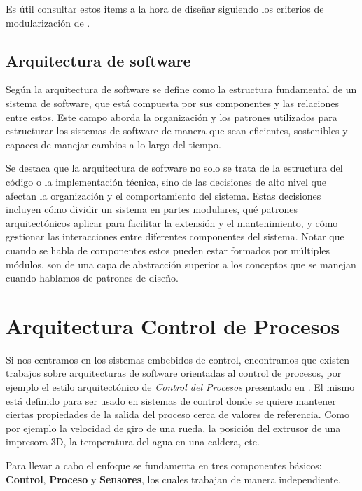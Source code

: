 Es útil consultar estos items a la hora de diseñar siguiendo los criterios de modularización de \cite{Parnas1972}.

\subsection{Arquitectura de software}

Según \cite{ShawGarlan1996} la arquitectura de software se define como la estructura fundamental de un sistema de software, que está compuesta por sus componentes y las relaciones entre estos. Este campo aborda la organización y los patrones utilizados para estructurar los sistemas de software de manera que sean eficientes, sostenibles y capaces de manejar cambios a lo largo del tiempo.

Se destaca que la arquitectura de software no solo se trata de la estructura del código o la implementación técnica, sino de las decisiones de alto nivel que afectan la organización y el comportamiento del sistema. Estas decisiones incluyen cómo dividir un sistema en partes modulares, qué patrones arquitectónicos aplicar para facilitar la extensión y el mantenimiento, y cómo gestionar las interacciones entre diferentes componentes del sistema. Notar que cuando se habla de componentes estos pueden estar formados por múltiples módulos, son de una capa de abstracción superior a los conceptos que se manejan cuando hablamos de patrones de diseño.


\section{Arquitectura Control de Procesos}

Si nos centramos en los sistemas embebidos de control, encontramos que existen trabajos sobre arquitecturas de software orientadas al control de procesos, por ejemplo el estilo arquitectónico de \textit{Control del Procesos} presentado en \cite{ShawGarlan1996}. El mismo está definido para ser usado en sistemas de control donde se quiere mantener ciertas propiedades de la salida del proceso cerca de valores de referencia. Como por ejemplo la velocidad de giro de una rueda, la posición del extrusor de una impresora 3D, la temperatura del agua en una caldera, etc.

Para llevar a cabo el enfoque se fundamenta en tres componentes básicos: \textbf{Control}, \textbf{Proceso} y \textbf{Sensores}, los cuales trabajan de manera independiente.

